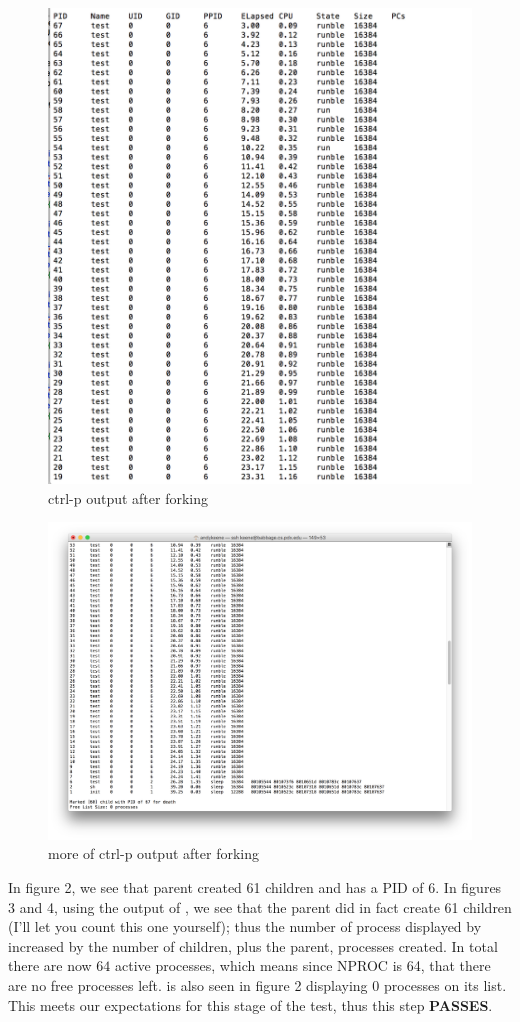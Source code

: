 \documentclass[11pt,letterpaper]{report}
\begin{document}
\begin{figure}[h!]
\centering
\includegraphics[width=0.8\linewidth]{zombie-allprocs.png}
\caption{ctrl-p output after forking}
\label{fig:2}
\end{figure}

\begin{figure}[h!]
\centering
\includegraphics[width=0.8\linewidth]{zombie-processes.png}
\caption{more of ctrl-p output after forking}
\label{fig:3}
\end{figure}

\pagebreak
In figure 2, we see that parent created 61 children and has a PID of 6. In figures 3 and 4, using the output of , we see that the parent did in fact create 61 children (I'll let you count this one yourself); thus the number of process displayed by  increased by the number of children, plus the parent, processes created. In total there are now $64$ active processes, which means since NPROC is 64, that there are no free processes left.  is also seen in figure 2 displaying 0 processes on its list. This meets our expectations for this stage of the test, thus this step \textbf{PASSES}.
\end{document}
